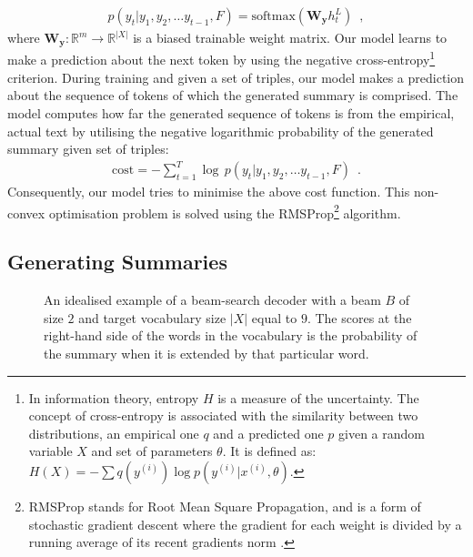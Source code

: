 \documentclass[preprint,5p]{elsarticle}
\begin{document}
\begin{align} \label{eq:softmax}
  p(y_t|y_1, y_2, \ldots y_{t-1}, F) = \text{softmax}(\mathbf{W_y}h_t^L) \enspace,
\end{align}where $\mathbf{W_y}:\mathbb{R}^{m} \rightarrow \mathbb{R}^{|X|}$ is a biased trainable weight matrix. Our model learns to make a prediction about the next token by using the negative cross-entropy\footnote{In information theory, entropy $H$ is a measure of the uncertainty. The concept of cross-entropy is associated with the similarity between two distributions, an empirical one $q$ and a predicted one $p$ given a random variable $X$ and set of parameters $\theta$. It is defined as: $H(X)= -\sum q(y^{(i)})\log p(y^{(i)}|x^{(i)}, \theta)$.} criterion. During training and given a set of triples, our model makes a prediction about the sequence of tokens of which the generated summary is comprised. The model computes how far the generated sequence of tokens is from the empirical, actual text by utilising the negative logarithmic probability of the generated summary given set of triples:
\begin{align}
  \text{cost} = - \sum_{t=1}^{T} \log\,p(y_t|y_1, y_2, \ldots y_{t-1}, F)\enspace.
\end{align}Consequently, our model tries to minimise the above cost function. This non-convex optimisation problem is solved using the RMSProp\footnote{RMSProp stands for Root Mean Square Propagation, and is a form of stochastic gradient descent where the gradient for each weight is divided by a running average of its recent gradients norm \cite{Tieleman2012}.} algorithm.


\subsection{Generating Summaries}
\label{subsec:GeneratingSummary}

\begin{figure*}[h]
  \centering
  
  \def\svgwidth{.95\linewidth}
  
  \caption{An idealised example of a beam-search decoder with a beam $B$ of size $2$ and target vocabulary size $|X|$ equal to $9$. The scores at the right-hand side of the words in the vocabulary is the probability of the summary when it is extended by that particular word.}
  \label{fig:beam-search}
\end{figure*}
\end{document}

